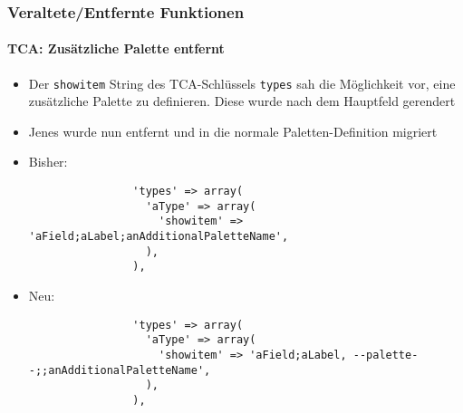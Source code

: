 \begin{frame}[fragile]
	\frametitle{Veraltete/Entfernte Funktionen}
	\framesubtitle{TCA: Zusätzliche Palette entfernt}

	\lstset{basicstyle=\tiny\ttfamily}

	\begin{itemize}

		\item Der \texttt{showitem} String des TCA-Schlüssels \texttt{types} sah die Möglichkeit vor,
			eine zusätzliche Palette zu definieren. Diese wurde nach dem Hauptfeld gerendert

		\item Jenes wurde nun entfernt und in die normale Paletten-Definition migriert

		\item Bisher:

			\begin{lstlisting}
				'types' => array(
				  'aType' => array(
				    'showitem' => 'aField;aLabel;anAdditionalPaletteName',
				  ),
				),
			\end{lstlisting}

		\item Neu:

			\begin{lstlisting}
				'types' => array(
				  'aType' => array(
				    'showitem' => 'aField;aLabel, --palette--;;anAdditionalPaletteName',
				  ),
				),
			\end{lstlisting}

	\end{itemize}

\end{frame}


